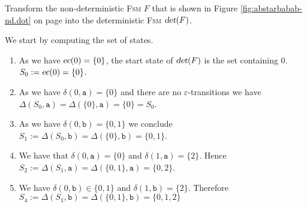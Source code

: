 \exerciseEng
Transform the non-deterministic \textsc{Fsm} $F$ that is shown in Figure \ref{fig:abstarbabab-nd.dot} on page
\pageref{fig:abstarbabab-nd.dot}  into the deterministic \textsc{Fsm} 
$\textsl{det}(F)$.  \eox

\solutionEng
We start by computing the set of states.
\begin{enumerate}
\item As we have $\textsl{ec}(0) = \{0\}$, the start state of $\textsl{det}(F)$  is the set containing $0$.
      \\[0.2cm]
      \hspace*{1.3cm}
      $S_0 := \textsl{ec}(0) = \{ 0 \}$.
\item As we have $\delta(0, \texttt{a}) = \{0\}$ and there are no $\varepsilon$-transitions we have
      \\[0.2cm]
      \hspace*{1.3cm}
      $\Delta(S_0, \texttt{a}) = \Delta(\{0\}, \texttt{a}) = \{0\} = S_0$.
\item As we have $\delta(0, \texttt{b}) = \{0, 1\}$ we conclude
      \\[0.2cm]
      \hspace*{1.3cm}
      $S_1 := \Delta(S_0, \texttt{b}) = \Delta(\{0\}, \texttt{b}) = \{ 0, 1 \}$.
\item We have that $\delta(0, \texttt{a}) = \{ 0 \}$ and $\delta(1, \texttt{a}) = \{ 2 \}$.
      Hence
      \\[0.2cm]
      \hspace*{1.3cm}
      $S_2 := \Delta(S_1, \texttt{a}) = \Delta(\{ 0, 1 \}, \texttt{a}) = \{ 0, 2 \}$.
\item We have $\delta(0, \texttt{b}) \in \{ 0, 1 \}$ and $\delta(1, \texttt{b}) = \{ 2 \}$.
      Therefore
      \\[0.2cm]
      \hspace*{1.3cm}
      $S_4 := \Delta(S_1, \texttt{b}) = \Delta(\{ 0, 1 \}, \texttt{b}) = \{ 0, 1, 2 \}$


\end{enumerate}

